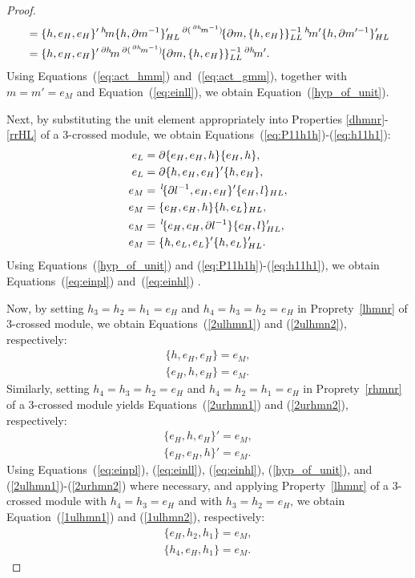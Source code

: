 \documentclass{tac}
\newcommand{\act}[1]{\,\sp{#1}\!}
\begin{document}
\begin{proof}
\begin{align}
  \nonumber
  &= \{h,e_H,e_H\}'\act{h}m\{h,\partial m^{-1}\}_{HL}'\act{\partial (\act{\partial h}m^{-1})}\{\partial m,\{h,e_H\}\}_{LL}^{-1}\act{h}m'\{h,\partial m'^{-1}\}_{HL}' \\
  \label{eq:act_gmm}
  &= \{h,e_H,e_H\}'\act{\partial h}m\act{\partial (\act{\partial h}m^{-1})}\{\partial m,\{h,e_H\}\}_{LL}^{-1}\act{\partial h}m'.
\end{align}
Using Equations~(\ref{eq:act_hmm}) and~(\ref{eq:act_gmm}), together with $m=m'=e_M$ and Equation~(\ref{eq:einll}), we obtain Equation~(\ref{hyp_of_unit}).

Next, by substituting the unit element appropriately into Properties \ref{dhmnr}-\ref{rrHL} of a 3-crossed module, we obtain Equations~(\ref{eq:P11h1h})-(\ref{eq:h11h1}):
\begin{align}
  \label{eq:P11h1h}
  e_L &= \partial\{e_H,e_H,h\}\{e_H,h\}, \\
  \label{eq:Ph11h1}
  e_L &= \partial\{h,e_H,e_H\}'\{h,e_H\}, \\
  \label{eq:Pl111l}
  e_M &= \act{l}\{\partial l^{-1},e_H,e_H\}'\{e_H,l\}_{HL}, \\
  \label{eq:11hh1}
  e_M &= \{e_H,e_H,h\}\{h,e_L\}_{HL},  \\
  \label{eq:11Pl1l}
  e_M &= \act{l}\{e_H,e_H,\partial l^{-1}\}\{e_H,l\}'_{HL},  \\
  \label{eq:h11h1}
  e_M &= \{h,e_L,e_L\}'\{h,e_L\}'_{HL}. 
\end{align}
Using Equations~(\ref{hyp_of_unit}) and (\ref{eq:P11h1h})-(\ref{eq:h11h1}), we obtain Equations~(\ref{eq:einpl}) and~(\ref{eq:einhl}) . 

Now, by setting $h_3=h_2=h_1=e_H$ and $h_4=h_3=h_2=e_H$ in Proprety~\ref{lhmnr} of 3-crossed module, we obtain Equations~(\ref{2ulhmn1}) and (\ref{2ulhmn2}), respectively:
\begin{align}
\label{2ulhmn1}
\{h, e_H, e_H \} = e_M,\\ 
\label{2ulhmn2}
\{e_H, h, e_H \} = e_M.
\end{align}
Similarly, setting $h_4=h_3=h_2=e_H$ and $h_4=h_2=h_1=e_H$ in Proprety~\ref{rhmnr} of a 3-crossed module yields Equations~(\ref{2urhmn1}) and (\ref{2urhmn2}), respectively:
\begin{align}
\label{2urhmn1}
\{e_H, h, e_H \}' = e_M,\\ 
\label{2urhmn2}
\{e_H, e_H, h \}' = e_M.
\end{align}
Using Equations~(\ref{eq:einpl}), (\ref{eq:einll}), (\ref{eq:einhl}), (\ref{hyp_of_unit}), and (\ref{2ulhmn1})-(\ref{2urhmn2}) where necessary, and applying Property~\ref{lhmnr} of a 3-crossed module with $h_4 = h_3 = e_H$ and with $h_3= h_2 = e_H$, we obtain Equation~(\ref{1ulhmn1}) and (\ref{1ulhmn2}), respectively:
  \begin{align}
\label{1ulhmn1}
\{e_H, h_2, h_1 \} = e_M,\\ 
\label{1ulhmn2}
\{h_4, e_H, h_1 \} = e_M.
\end{align}


\end{proof}
\end{document}

